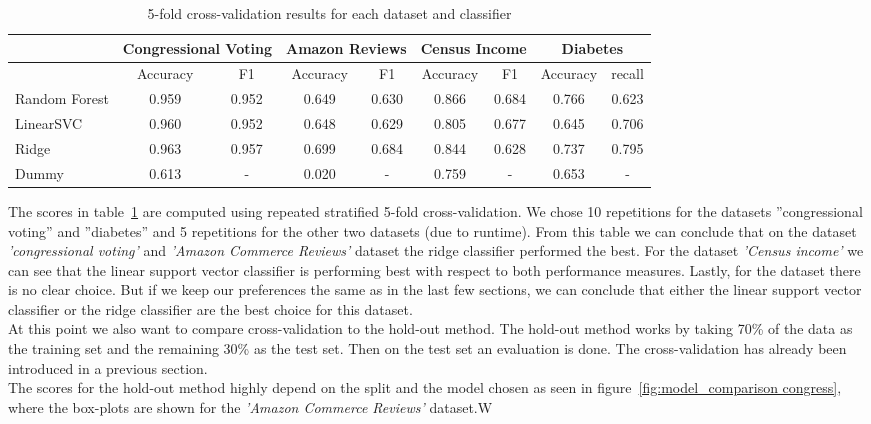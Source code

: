 \documentclass[a4paper,12pt]{article}
\begin{document}
\begin{table}[h!]
\centering
\footnotesize
\begin{tabular}{|l|c|c|c|c|c|c|c|c|}
\hline
& \multicolumn{2}{c|}{Congressional Voting} & \multicolumn{2}{c|}{Amazon Reviews} & \multicolumn{2}{c|}{Census Income} & \multicolumn{2}{c|}{Diabetes} \\
\hline
& Accuracy & F1 & Accuracy & F1 & Accuracy & F1 & Accuracy & recall \\
\hline
Random Forest & 0.959 & 0.952 & 0.649 & 0.630 & 0.866 & 0.684 & 0.766 & 0.623 \\
\hline
LinearSVC & 0.960 & 0.952 & 0.648 & 0.629 & 0.805 & 0.677 & 0.645 & 0.706 \\
\hline
Ridge & 0.963 & 0.957 & 0.699 & 0.684 & 0.844 & 0.628 & 0.737 & 0.795 \\
\hline
Dummy & 0.613 & - & 0.020 &- & 0.759 & - & 0.653 & - \\
\hline
\end{tabular}
\vspace{0.3cm}
\caption{5-fold cross-validation results for each dataset and classifier}
\label{tab:best_results}
\end{table}

The scores in table~\ref{tab:best_results} are computed using repeated stratified 5-fold
cross-validation. We chose 10 repetitions for the datasets ”congressional voting” and ”diabetes” and 5
repetitions for the other two datasets (due to runtime).
From this table we can conclude that on the dataset \textit{'congressional voting'} and 
\textit{'Amazon Commerce Reviews'} dataset the ridge classifier
performed the best. For the dataset \textit{'Census income'} we can see that
the linear support vector classifier is performing best with respect to both performance measures. Lastly,
for the  dataset there is no clear choice. But if we keep our preferences the same as in the
last few sections, we can conclude that either the linear support vector classifier or the ridge classifier
are the best choice for this dataset. \\
At this point we also want to compare cross-validation to the hold-out method. 
The hold-out method works by taking 70\% of the data as the training set and the remaining 30\% as the test set.
Then on the test set an evaluation is done. The cross-validation has already been introduced in a previous section.\\
The scores for the hold-out method
highly depend on the split and the model chosen as seen in figure~\ref{fig:model_comparison congress},
where the box-plots are shown for the
\textit{'Amazon Commerce Reviews'} dataset.W
\end{document}
